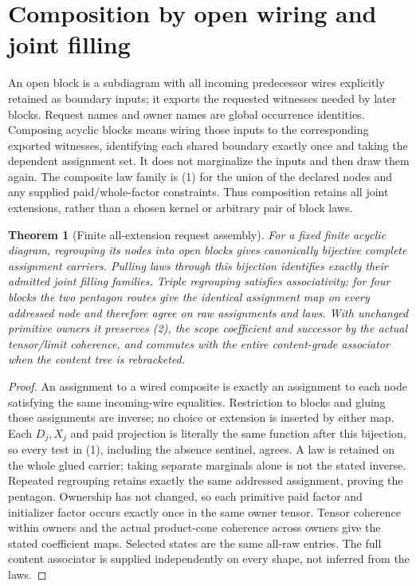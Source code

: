 \documentclass[11pt]{article}
\newtheorem{theorem}{Theorem}\newtheorem{proposition}{Proposition}
\begin{document}
\section{Composition by open wiring and joint filling}
An open block is a subdiagram with all incoming predecessor wires explicitly retained as boundary inputs; it exports the requested witnesses needed by later blocks. Request names and owner names are global occurrence identities. Composing acyclic blocks means wiring those inputs to the corresponding exported witnesses, identifying each shared boundary exactly once and taking the dependent assignment set. It does not marginalize the inputs and then draw them again. The composite law family is (1) for the union of the declared nodes and any supplied paid/whole-factor constraints. Thus composition retains all joint extensions, rather than a chosen kernel or arbitrary pair of block laws.

\begin{theorem}[Finite all-extension request assembly]
For a fixed finite acyclic diagram, regrouping its nodes into open blocks gives canonically bijective complete assignment carriers. Pulling laws through this bijection identifies exactly their admitted joint filling families. Triple regrouping satisfies associativity; for four blocks the two pentagon routes give the identical assignment map on every addressed node and therefore agree on raw assignments and laws. With unchanged primitive owners it preserves (2), the scope coefficient and successor by the actual tensor/limit coherence, and commutes with the entire content-grade associator when the content tree is rebracketed.
\end{theorem}
\begin{proof}
An assignment to a wired composite is exactly an assignment to each node satisfying the same incoming-wire equalities. Restriction to blocks and gluing those assignments are inverse; no choice or extension is inserted by either map. Each $D_j,X_j$ and paid projection is literally the same function after this bijection, so every test in (1), including the absence sentinel, agrees. A law is retained on the whole glued carrier; taking separate marginals alone is not the stated inverse. Repeated regrouping retains exactly the same addressed assignment, proving the pentagon. Ownership has not changed, so each primitive paid factor and initializer factor occurs exactly once in the same owner tensor. Tensor coherence within owners and the actual product-cone coherence across owners give the stated coefficient maps. Selected states are the same all-raw entries. The full content associator is supplied independently on every shape, not inferred from the laws.\end{proof}
\end{document}
